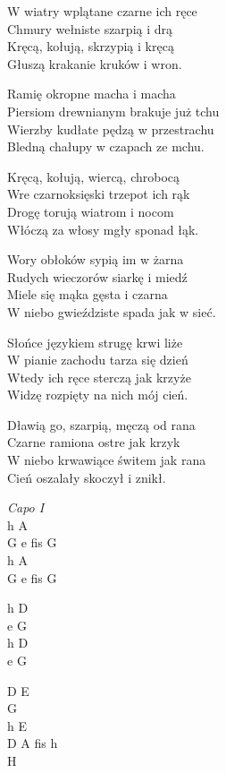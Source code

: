 \begin{text}
    \chordfill
    W wiatry wplątane czarne ich ręce\\
    Chmury wełniste szarpią i drą\\
    Kręcą, kołują, skrzypią i kręcą\\
    Głuszą krakanie kruków i wron.

    Ramię okropne macha i macha\\
    Piersiom drewnianym brakuje już tchu\\
    Wierzby kudłate pędzą w przestrachu\\
    Bledną chałupy w czapach ze mchu.

    Kręcą, kołują, wiercą, chrobocą\\
    Wre czarnoksięski trzepot ich rąk\\
    Drogę torują wiatrom i nocom\\
    Włóczą za włosy mgły sponad łąk.

    Wory obłoków sypią im w żarna\\
    Rudych wieczorów siarkę i miedź\\
    Miele się mąka gęsta i czarna\\
    W niebo gwieździste spada jak w sieć.

    Słońce językiem strugę krwi liże\\
    W pianie zachodu tarza się dzień\\
    Wtedy ich ręce sterczą jak krzyże\\
    Widzę rozpięty na nich mój cień.

    Dławią go, szarpią, męczą od rana\\
    Czarne ramiona ostre jak krzyk\\
    W niebo krwawiące świtem jak rana\\
    Cień oszalały skoczył i znikł.
\end{text}
\begin{chord}
    \textit{Capo I}\\
    h A\\
    G e fis G\\
    h A\\
    G e fis G

    h D\\
    e G\\
    h D\\
    e G

    D E\\
    G\\
    h E\\
    D A fis h\\
    H
\end{chord}